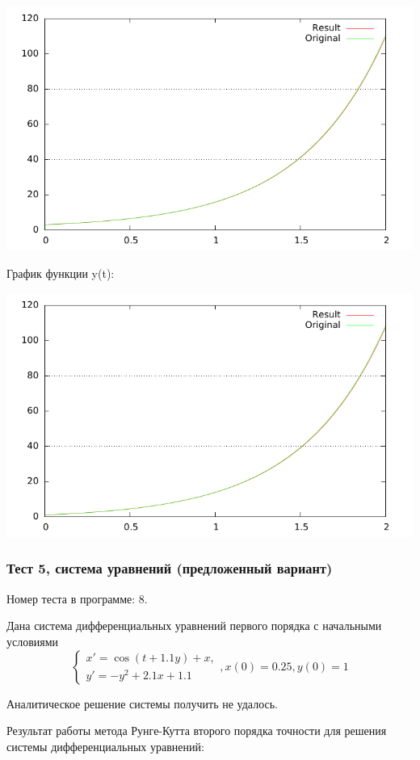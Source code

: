 \documentclass[a4paper,11pt]{report}
\begin{document}
\includegraphics{../plots/test4_1.pdf}

График функции y(t):

\includegraphics{../plots/test4_2.pdf}

\subsubsection{Тест 5, система уравнений (предложенный вариант)}
Номер теста в программе: 8.

Дана система дифференциальных уравнений первого порядка с начальными условиями
$$
\begin{cases}
 x' = \cos (t + 1.1y) + x, \\
 y' = -y^2 + 2.1x + 1.1
\end{cases},
x(0) = 0.25, y(0) = 1
$$

Аналитическое решение системы получить не удалось.

Результат работы метода Рунге-Кутта второго порядка точности для решения системы дифференциальных уравнений:
\end{document}

